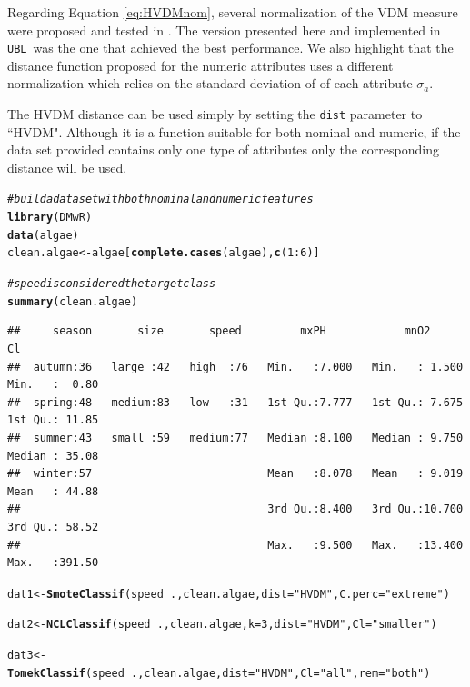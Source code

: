 \documentclass[10pt,a4paper]{article}\usepackage[]{graphicx}\usepackage[]{color}
\makeatletter
\newcommand{\hlnum}[1]{\textcolor[rgb]{0.686,0.059,0.569}{#1}}%
\newcommand{\hlstr}[1]{\textcolor[rgb]{0.192,0.494,0.8}{#1}}%
\newcommand{\hlcom}[1]{\textcolor[rgb]{0.678,0.584,0.686}{\textit{#1}}}%
\newcommand{\hlopt}[1]{\textcolor[rgb]{0,0,0}{#1}}%
\newcommand{\hlstd}[1]{\textcolor[rgb]{0.345,0.345,0.345}{#1}}%
\newcommand{\hlkwb}[1]{\textcolor[rgb]{0.69,0.353,0.396}{#1}}%
\newcommand{\hlkwc}[1]{\textcolor[rgb]{0.333,0.667,0.333}{#1}}%
\newcommand{\hlkwd}[1]{\textcolor[rgb]{0.737,0.353,0.396}{\textbf{#1}}}%
\newenvironment{kframe}{%
 \def\at@end@of@kframe{}%
 \ifinner\ifhmode%
  \def\at@end@of@kframe{\end{minipage}}%
  \begin{minipage}{\columnwidth}%
 \fi\fi%
 \def\FrameCommand##1{\hskip\@totalleftmargin \hskip-\fboxsep
 \colorbox{shadecolor}{##1}\hskip-\fboxsep
     \hskip-\linewidth \hskip-\@totalleftmargin \hskip\columnwidth}%
 \MakeFramed {\advance\hsize-\width
   \@totalleftmargin\z@ \linewidth\hsize
   \@setminipage}}%
 {\par\unskip\endMakeFramed%
 \at@end@of@kframe}
\newenvironment{knitrout}{}{} %
\newcommand{\UBL}{\texttt{UBL}\ }
\makeatother
\begin{document}
Regarding Equation \ref{eq:HVDMnom}, several normalization of the VDM measure were proposed and tested in \cite{wilson1997improved}. The version presented here and implemented in \UBL was the one that achieved the best performance. We also highlight that the distance function proposed for the numeric attributes uses a different normalization which relies on the standard deviation of of each attribute $\sigma_a$.


The HVDM distance can be used simply by setting the \texttt{dist} parameter to ``HVDM". Although it is a function suitable for both nominal and numeric, if the data set provided contains only one type of attributes only the corresponding distance will be used.



\begin{knitrout}\footnotesize
{}\color{fgcolor}\begin{kframe}
\begin{alltt}
\hlcom{# build a data set with both nominal and numeric features}
\hlkwd{library}\hlstd{(DMwR)}
\hlkwd{data}\hlstd{(algae)}
\hlstd{clean.algae} \hlkwb{<-} \hlstd{algae[}\hlkwd{complete.cases}\hlstd{(algae),}\hlkwd{c}\hlstd{(}\hlnum{1}\hlopt{:}\hlnum{6}\hlstd{)]}

\hlcom{# speed is considered the target class}
\hlkwd{summary}\hlstd{(clean.algae)}
\end{alltt}
\begin{verbatim}
##     season       size       speed         mxPH            mnO2              Cl        
##  autumn:36   large :42   high  :76   Min.   :7.000   Min.   : 1.500   Min.   :  0.80  
##  spring:48   medium:83   low   :31   1st Qu.:7.777   1st Qu.: 7.675   1st Qu.: 11.85  
##  summer:43   small :59   medium:77   Median :8.100   Median : 9.750   Median : 35.08  
##  winter:57                           Mean   :8.078   Mean   : 9.019   Mean   : 44.88  
##                                      3rd Qu.:8.400   3rd Qu.:10.700   3rd Qu.: 58.52  
##                                      Max.   :9.500   Max.   :13.400   Max.   :391.50
\end{verbatim}
\begin{alltt}
\hlstd{dat1} \hlkwb{<-} \hlkwd{SmoteClassif}\hlstd{(speed}\hlopt{~}\hlstd{., clean.algae,} \hlkwc{dist}\hlstd{=}\hlstr{"HVDM"}\hlstd{,} \hlkwc{C.perc}\hlstd{=}\hlstr{"extreme"}\hlstd{)}

\hlstd{dat2} \hlkwb{<-} \hlkwd{NCLClassif}\hlstd{(speed}\hlopt{~}\hlstd{., clean.algae,} \hlkwc{k}\hlstd{=}\hlnum{3}\hlstd{,} \hlkwc{dist}\hlstd{=}\hlstr{"HVDM"}\hlstd{,} \hlkwc{Cl}\hlstd{=}\hlstr{"smaller"}\hlstd{)}

\hlstd{dat3} \hlkwb{<-} \hlkwd{TomekClassif}\hlstd{(speed}\hlopt{~}\hlstd{., clean.algae,} \hlkwc{dist}\hlstd{=}\hlstr{"HVDM"}\hlstd{,} \hlkwc{Cl}\hlstd{=}\hlstr{"all"}\hlstd{,} \hlkwc{rem}\hlstd{=}\hlstr{"both"}\hlstd{)}
\end{alltt}
\end{kframe}
\end{knitrout}
\end{document}
